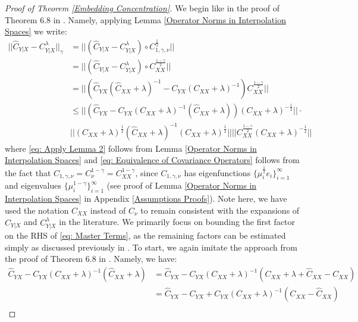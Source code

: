 \documentclass[accepted]{article}
\theoremstyle{definition}
\begin{document}
\begin{proof}[Proof of Theorem \ref{Embedding Concentration}]
\label{Main Result Proofs}
We begin like in the proof of Theorem 6.8 in \cite{fischer2020sobolev}. Namely, applying Lemma \ref{Operator Norms in Interpolation Spaces} we write:
\begin{align}
    ||\hat{C}_{Y|X} - C^{\lambda}_{Y|X}||_{\gamma} & = ||(\hat{C}_{Y|X} - C^{\lambda}_{Y|X}) \circ C^{\frac{1}{2}}_{1, \gamma, \nu}|| \label{eq: Apply Lemma 2} \\
    & = ||(\hat{C}_{Y|X} - C^{\lambda}_{Y|X}) \circ C^{\frac{1 - \gamma}{2}}_{XX}|| \label{eq: Equivalence of Covariance Operators} \\
    & = ||(\hat{C}_{YX}(\hat{C}_{XX} + \lambda)^{-1} - C_{YX}(C_{XX} + \lambda)^{-1}) C^{\frac{1 - \gamma}{2}}_{XX}|| \nonumber \\
    & \leq ||(\hat{C}_{YX} - C_{YX}(C_{XX} + \lambda)^{-1}(\hat{C}_{XX} + \lambda))(C_{XX} + \lambda)^{-\frac{1}{2}}|| \cdot \nonumber \\
    & ||(C_{XX} + \lambda)^{\frac{1}{2}}(\hat{C}_{XX} + \lambda)^{-1}(C_{XX} + \lambda)^{\frac{1}{2}}||||C^{\frac{1 - \gamma}{2}}_{XX}(C_{XX} + \lambda)^{-\frac{1}{2}}||\label{eq: Master Terms}
\end{align}
where \eqref{eq: Apply Lemma 2} follows from Lemma \ref{Operator Norms in Interpolation Spaces} and \eqref{eq: Equivalence of Covariance Operators} follows from the fact that $C_{1, \gamma, \nu} = C^{1 - \gamma}_{\nu} = C^{1 - \gamma}_{XX}$, since $C_{1, \gamma, \nu}$ has eigenfunctions $\{\mu_i^{\frac{1}{2}}e_i\}_{i = 1}^{\infty}$ and eigenvalues $\{\mu^{1 - \gamma}_i\}_{i = 1}^{\infty}$ (see proof of Lemma \ref{Operator Norms in Interpolation Spaces} in Appendix \ref{Assumptions Proofs}). Note here, we have used the notation $C_{XX}$ instead of $C_{\nu}$ to remain consistent with the expansions of $\hat{C}_{Y|X}$ and $C^{\lambda}_{Y|X}$ in the literature. We primarily focus on bounding the first factor on the RHS of \eqref{eq: Master Terms}, as the remaining factors can be estimated simply as discussed previously in \cite{fischer2020sobolev}. To start, we again imitate the approach from the proof of Theorem 6.8 in \cite{fischer2020sobolev}. Namely, we have:
\begin{align*}
    \hat{C}_{YX} - C_{YX}(C_{XX} + \lambda)^{-1}(\hat{C}_{XX} + \lambda) &= \hat{C}_{YX} - C_{YX}(C_{XX} + \lambda)^{-1}(C_{XX} + \lambda + \hat{C}_{XX} - C_{XX}) \\
    & = \hat{C}_{YX} - C_{YX} + C_{YX}(C_{XX} + \lambda)^{-1}(C_{XX} - \hat{C}_{XX}) \\

\end{align*}
\end{proof}
\end{document}
